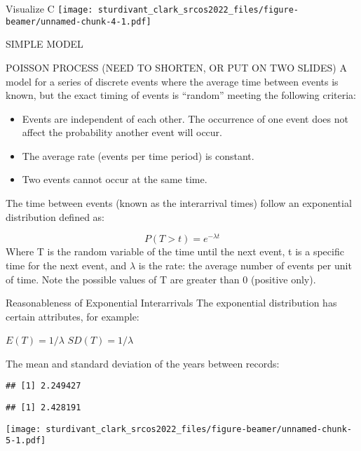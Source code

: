 \documentclass[
  ignorenonframetext,
]{beamer}
\begin{document}
\begin{frame}{Visualize C}
\protect\hypertarget{visualize-c}{}
\texttt{[image: sturdivant\_clark\_srcos2022\_files/figure-beamer/unnamed-chunk-4-1.pdf]}
\end{frame}

\begin{frame}{SIMPLE MODEL}
\protect\hypertarget{simple-model}{}
\begin{block}{POISSON PROCESS (NEED TO SHORTEN, OR PUT ON TWO SLIDES)}
\protect\hypertarget{poisson-process-need-to-shorten-or-put-on-two-slides}{}
A model for a series of discrete events where the average time between
events is known, but the exact timing of events is ``random'' meeting
the following criteria:

\begin{itemize}
\item
  Events are independent of each other. The occurrence of one event does
  not affect the probability another event will occur.
\item
  The average rate (events per time period) is constant.
\item
  Two events cannot occur at the same time.
\end{itemize}

The time between events (known as the interarrival times) follow an
exponential distribution defined as:

\[P(T>t) = e^{-\lambda t}\] Where T is the random variable of the time
until the next event, t is a specific time for the next event, and
\(\lambda\) is the rate: the average number of events per unit of time.
Note the possible values of T are greater than 0 (positive only).
\end{block}
\end{frame}

\begin{frame}[fragile]{Reasonableness of Exponential Interarrivals}
\protect\hypertarget{reasonableness-of-exponential-interarrivals}{}
The exponential distribution has certain attributes, for example:

\(E(T) = 1/\lambda\) \(SD(T) = 1/\lambda\)

The mean and standard deviation of the years between records:

\begin{verbatim}
## [1] 2.249427
\end{verbatim}

\begin{verbatim}
## [1] 2.428191
\end{verbatim}

\texttt{[image: sturdivant\_clark\_srcos2022\_files/figure-beamer/unnamed-chunk-5-1.pdf]}
\end{frame}
\end{document}

